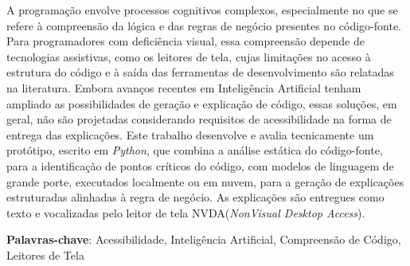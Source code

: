 \documentclass[
    12pt,                   %
    openright,              %
    oneside,                %
    a4paper,                %
    sumario=tradicional,    %
    english,                %
    brazil,                 %
    ]{abntex2}
\begin{document}
\frenchspacing

\pretextual

\imprimircapa

\imprimirfolhaderosto






\begin{resumo}
 \noindent
 A programação envolve processos cognitivos complexos, especialmente no que se refere à compreensão da lógica e das regras de negócio presentes no código-fonte. Para programadores com deficiência visual, essa compreensão depende de tecnologias assistivas, como os leitores de tela, cujas limitações no acesso à estrutura do código e à saída das ferramentas de desenvolvimento são relatadas na literatura. Embora avanços recentes em Inteligência Artificial tenham ampliado as possibilidades de geração e explicação de código, essas soluções, em geral, não são projetadas considerando requisitos de acessibilidade na forma de entrega das explicações. Este trabalho desenvolve e avalia tecnicamente um protótipo, escrito em \textit{Python}, que combina a análise estática do código-fonte, para a identificação de pontos críticos do código, com modelos de linguagem de grande porte, executados localmente ou em nuvem, para a geração de explicações estruturadas alinhadas à regra de negócio. As explicações são entregues como texto e vocalizadas pelo leitor de tela NVDA(\textit{NonVisual Desktop Access}).
 \vspace{\onelineskip}

 \noindent
 \textbf{Palavras-chave}: Acessibilidade, Inteligência Artificial, Compreensão de Código, Leitores de Tela
\end{resumo}
\end{document}
